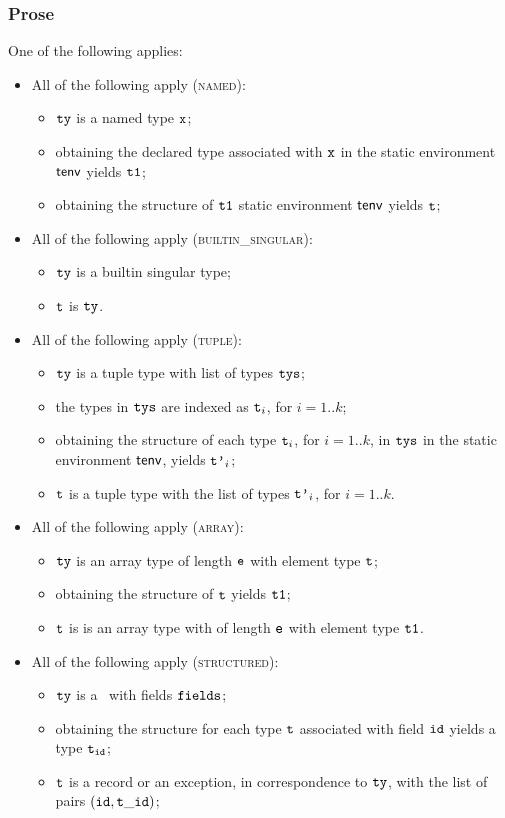 \subsubsection{Prose}
One of the following applies:
\begin{itemize}
\item All of the following apply (\textsc{named}):
  \begin{itemize}
  \item $\texttt{ty}$ is a named type $\texttt{x}$;
  \item obtaining the declared type associated with $\texttt{x}$ in the static environment $\textsf{tenv}$ yields $\texttt{t1}$\ProseOrTypeError;
  \item obtaining the structure of $\texttt{t1}$ static environment $\textsf{tenv}$ yields $\texttt{t}$\ProseOrTypeError;
  \end{itemize}
\item All of the following apply (\textsc{builtin\_singular}):
  \begin{itemize}
  \item $\texttt{ty}$ is a builtin singular type;
  \item $\texttt{t}$ is $\texttt{ty}$.
  \end{itemize}
\item All of the following apply (\textsc{tuple}):
  \begin{itemize}
  \item $\texttt{ty}$ is a tuple type with list of types $\texttt{tys}$;
  \item the types in $\texttt{tys}$ are indexed as $\texttt{t}_i$, for $i=1..k$;
  \item obtaining the structure of each type $\texttt{t}_i$, for $i=1..k$, in $\texttt{tys}$ in the static environment $\textsf{tenv}$,
  yields $\texttt{t'}_i$\ProseOrTypeError;
  \item $\texttt{t}$ is a tuple type with the list of types $\texttt{t'}_i$, for $i=1..k$.
  \end{itemize}
\item All of the following apply (\textsc{array}):
  \begin{itemize}
    \item $\texttt{ty}$ is an array type of length $\texttt{e}$ with element type $\texttt{t}$;
    \item obtaining the structure of $\texttt{t}$ yields $\texttt{t1}$\ProseOrTypeError;
    \item $\texttt{t}$ is is an array type with of length $\texttt{e}$ with element type $\texttt{t1}$.
  \end{itemize}
\item All of the following apply (\textsc{structured}):
  \begin{itemize}
  \item $\texttt{ty}$ is a \structuredtype\ with fields $\texttt{fields}$;
  \item obtaining the structure for each type $\texttt{t}$ associated with field $\texttt{id}$ yields a type $\texttt{t}_{\texttt{id}}$\ProseOrTypeError;
  \item $\texttt{t}$ is a record or an exception, in correspondence to $\texttt{ty}$, with the list of pairs $(\texttt{id}, \texttt{t}\_\texttt{id})$;
  \end{itemize}
\end{itemize}

